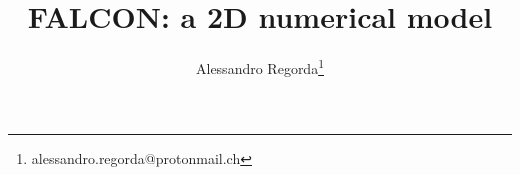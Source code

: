 \documentclass[a4paper,10pt,fleqn]{falcon}
\makeatletter
\def\correspondingauthor{\footnote{alessandro.regorda@protonmail.ch}}
\makeatother
\begin{document}
\title{FALCON: a 2D numerical model}

\author[1]{\orcidA{}Alessandro Regorda\correspondingauthor{}}

\maketitle













\clearpage


\end{document}
